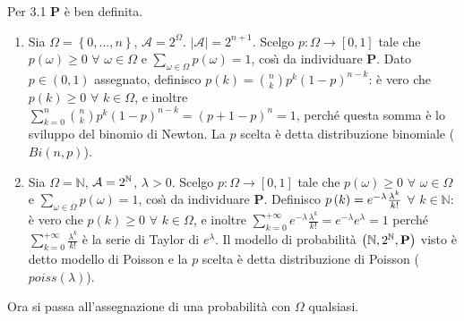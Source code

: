 \documentclass{article}
\begin{document}
Per 3.1 $\mathbf{P}$ \`{e} ben definita.

\begin{enumerate}
\item Sia $\Omega =\left\{ 0,...,n\right\} $, $\mathcal{A}=2^{\Omega }$. $%
\left\vert \mathcal{A}\right\vert =2^{n+1}$. Scelgo $p:\Omega \rightarrow %
\left[ 0,1\right] $ tale che $p\left( \omega \right) \geq 0$ $\forall $ $%
\omega \in \Omega $ e $\sum_{\omega \in \Omega }p\left( \omega \right) =1$,
cos\`{\i} da individuare $\mathbf{P}$. Dato $p\in \left( 0,1\right) $
assegnato, definisco $p\left( k\right) =\binom{n}{k}p^{k}\left( 1-p\right)
^{n-k}$: \`{e} vero che $p\left( k\right) \geq 0$ $\forall $ $k\in \Omega $,
e inoltre $\sum_{k=0}^{n}\binom{n}{k}p^{k}\left( 1-p\right) ^{n-k}=\left(
p+1-p\right) ^{n}=1$, perch\'{e} questa somma \`{e} lo sviluppo del binomio
di Newton. La $p$ scelta \`{e} detta distribuzione binomiale ($Bi\left(
n,p\right) $).

\item Sia $\Omega =%
\mathbb{N}
$, $\mathcal{A}=2^{%
\mathbb{N}
}$, $\lambda >0$. Scelgo $p:\Omega \rightarrow \left[ 0,1\right] $ tale che $%
p\left( \omega \right) \geq 0$ $\forall $ $\omega \in \Omega $ e $%
\sum_{\omega \in \Omega }p\left( \omega \right) =1$, cos\`{\i} da
individuare $\mathbf{P}$. Definisco $p\left( k\right) =e^{-\lambda }\frac{%
\lambda ^{k}}{k!}$ $\forall $ $k\in 
\mathbb{N}
$: \`{e} vero che $p\left( k\right) \geq 0$ $\forall $ $k\in \Omega $, e
inoltre $\sum_{k=0}^{+\infty }e^{-\lambda }\frac{\lambda ^{k}}{k!}%
=e^{-\lambda }e^{\lambda }=1$ perch\'{e} $\sum_{k=0}^{+\infty }\frac{\lambda
^{k}}{k!}$ \`{e} la serie di Taylor di $e^{\lambda }$. Il modello di
probabilit\`{a} $\left( 
\mathbb{N}
,2^{%
\mathbb{N}
},\mathbf{P}\right) $ visto \`{e} detto modello di Poisson e la $p$ scelta 
\`{e} detta distribuzione di Poisson ($poiss(\lambda )$).
\end{enumerate}

Ora si passa all'assegnazione di una probabilit\`{a} con $\Omega $ qualsiasi.
\end{document}
